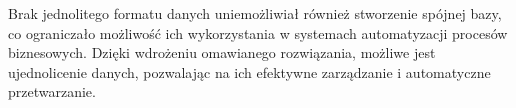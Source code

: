 Brak jednolitego formatu danych uniemożliwiał również stworzenie spójnej bazy, co ograniczało możliwość ich wykorzystania w systemach automatyzacji procesów biznesowych. Dzięki wdrożeniu omawianego rozwiązania, możliwe jest ujednolicenie danych, pozwalając na ich efektywne zarządzanie i automatyczne przetwarzanie.